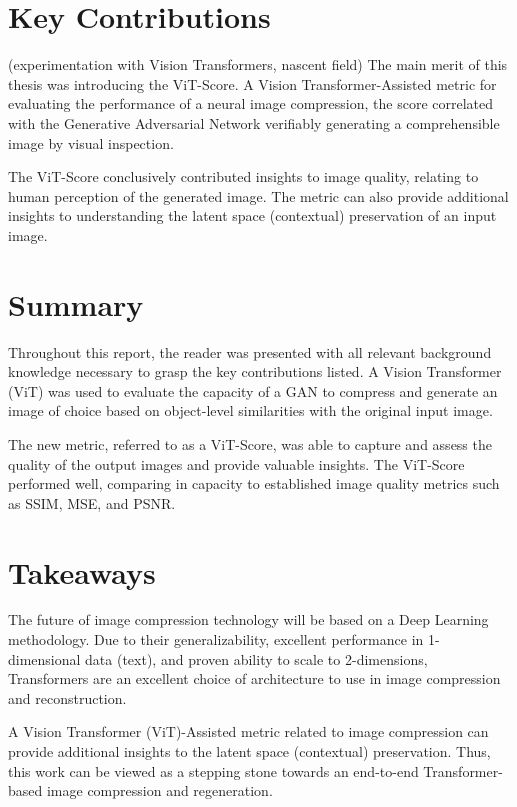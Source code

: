 \section{Key Contributions}

(experimentation with Vision Transformers, nascent field)
The main merit of this thesis was introducing the ViT-Score.
A Vision Transformer-Assisted metric for evaluating the performance of a neural image compression, the score
correlated with the Generative Adversarial Network verifiably generating a comprehensible image by visual inspection.

The ViT-Score conclusively contributed insights to image quality, relating to human perception of the generated image. 
The metric can also provide additional insights to understanding the latent space (contextual) preservation of an input image.


\section{Summary}

Throughout this report, the reader was presented with all relevant background knowledge necessary 
to grasp the key contributions listed. 
A Vision Transformer (ViT) was used to evaluate the capacity of 
a GAN to compress and generate an image of choice based on object-level similarities with the original input image.

The new metric, referred to as a ViT-Score, was able to capture and assess the quality of the output images and provide 
valuable insights. The ViT-Score performed well, comparing in capacity to established image quality metrics such as
SSIM, MSE, and PSNR. 


\section{Takeaways}

The future of image compression technology will be based on a Deep Learning methodology.
Due to their generalizability, excellent performance in 1-dimensional data (text),
and proven ability to scale to 2-dimensions, Transformers are an excellent choice of 
architecture to use in image compression and reconstruction.


A Vision Transformer (ViT)-Assisted metric related to image compression can provide 
additional insights to the latent space (contextual) preservation.
Thus, this work can be viewed as a stepping stone towards an end-to-end Transformer-based
image compression and regeneration.


